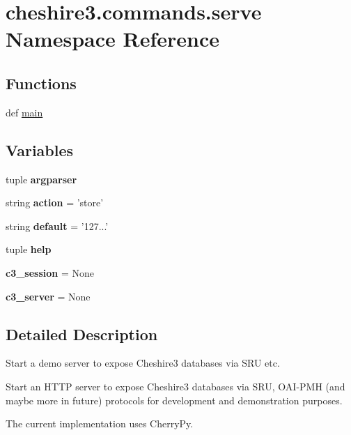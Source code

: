 \hypertarget{namespacecheshire3_1_1commands_1_1serve}{\section{cheshire3.\-commands.\-serve Namespace Reference}
\label{namespacecheshire3_1_1commands_1_1serve}
}
\subsection*{Functions}
\begin{DoxyCompactItemize}
\item 
def \hyperlink{namespacecheshire3_1_1commands_1_1serve_af6485d0c98fc3c34b59d0a71f64eb506}{main}
\end{DoxyCompactItemize}
\subsection*{Variables}
\begin{DoxyCompactItemize}
\item 
tuple {\bfseries argparser}
\item 
\hypertarget{namespacecheshire3_1_1commands_1_1serve_a2ed1c7a08077de0ce5be407674bbacc7}{string {\bfseries action} = 'store'}\label{namespacecheshire3_1_1commands_1_1serve_a2ed1c7a08077de0ce5be407674bbacc7}

\item 
\hypertarget{namespacecheshire3_1_1commands_1_1serve_a525e35911ee51829a621cbc1dec25fd8}{string {\bfseries default} = '127...'}\label{namespacecheshire3_1_1commands_1_1serve_a525e35911ee51829a621cbc1dec25fd8}

\item 
tuple {\bfseries help}
\item 
\hypertarget{namespacecheshire3_1_1commands_1_1serve_a5b66fee0baf25551a5098880e9f9c79f}{{\bfseries c3\-\_\-session} = None}\label{namespacecheshire3_1_1commands_1_1serve_a5b66fee0baf25551a5098880e9f9c79f}

\item 
\hypertarget{namespacecheshire3_1_1commands_1_1serve_a59234499130d4314e2b092d663099585}{{\bfseries c3\-\_\-server} = None}\label{namespacecheshire3_1_1commands_1_1serve_a59234499130d4314e2b092d663099585}

\end{DoxyCompactItemize}


\subsection{Detailed Description}
\begin{DoxyVerb}Start a demo server to expose Cheshire3 databases via SRU etc.

Start an HTTP server to expose Cheshire3 databases via SRU, OAI-PMH (and maybe
more in future) protocols for development and demonstration purposes.

The current implementation uses CherryPy. 
\end{DoxyVerb}
 


